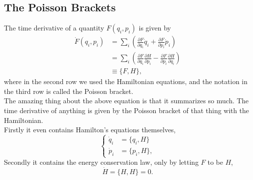 \documentclass{article}
\newcommand{\be}{\begin{equation}}
\newcommand{\ee}{\end{equation}}
\newcommand{\bs}{\be\begin{split}}
\newcommand{\p}{\partial}
\newcommand{\1}{\left}
\newcommand{\2}{\right}
\begin{document}
\subsection{The Poisson Brackets}
The time derivative of a quantity $F(q_i, p_i)$ is given by
\bs
\dot F(q_i, p_i)&=\sum_i \1(\frac{\p F}{\p q_i} \dot q_i+\frac{\p F}{\p p_i} \dot p_i\2)\\
&=\sum_i \1(\frac{\p F}{\p q_i} \frac{\p H}{\p p_i}-\frac{\p F}{\p p_i} \frac{\p H}{\p q_i}\2)\\
&\equiv \{F,H\},
\end{split}\ee
where in the second row we used the Hamiltonian equations, and the notation in the third row is called the Poisson bracket.\\
The amazing thing about the above equation is that it summarizes so much. The time derivative of anything is given by the Poisson bracket of that thing with the Hamiltonian.\\
Firstly it even contains Hamilton's equations themselves,
\be\1\{\begin{split}
\dot q_i&=\{q_i,H\}\\
\dot p_i&=\{p_i,H\},
\end{split}\2.\ee
Secondly it contains the energy conservation law, only by letting $F$ to be $H$,
\be
\dot H=\{H,H\}=0.
\ee
\end{document}

